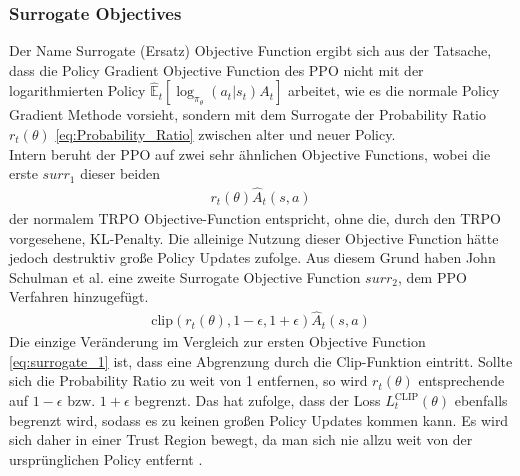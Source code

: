 \subsubsection{Surrogate Objectives} \label{sec:Surrogate_Objectives}
Der Name Surrogate (Ersatz) Objective Function ergibt sich aus der Tatsache, dass die Policy Gradient Objective Function des PPO nicht mit der logarithmierten Policy $\mathbb{\hat{E}}_t[\log_{\pi_{\theta}}(a_t|s_t)A_t]$ arbeitet, wie es die normale Policy Gradient Methode vorsieht, sondern mit dem Surrogate der Probability Ratio $r_{t}(\theta)$ \ref{eq:Probability_Ratio} zwischen alter und neuer Policy.\\
Intern beruht der PPO auf zwei sehr ähnlichen Objective Functions, wobei die erste $surr_1$ dieser beiden
\begin{align}
	\label{eq:surrogate_1}
	r_{t}(\theta) \hat{A}_{t}(s, a)
\end{align}
der normalem TRPO Objective-Function entspricht, ohne die, durch den TRPO vorgesehene, KL-Penalty. \cite[S. 3 f.]{PPO}
Die alleinige Nutzung dieser Objective Function hätte jedoch destruktiv große Policy Updates zufolge. Aus diesem Grund haben John Schulman et al. eine zweite Surrogate Objective Function $surr_2$, dem PPO Verfahren hinzugefügt. 
\begin{align}
	\label{eq:surrogate_2}
	\text{clip}(r_{t}(\theta), 1 - \epsilon, 1 + \epsilon) \hat{A}_{t}(s, a)
\end{align}
Die einzige Veränderung im Vergleich zur ersten Objective Function \ref{eq:surrogate_1} ist, dass eine Abgrenzung durch die Clip-Funktion eintritt. Sollte sich die Probability Ratio zu weit von 1 entfernen, so wird $r_{t}(\theta)$ entsprechende auf $1 - \epsilon \text{ bzw. } 1 + \epsilon$ begrenzt. Das hat zufolge, dass der Loss $L^{\text{CLIP}}_{t}(\theta)$ ebenfalls begrenzt wird, sodass es zu keinen großen Policy Updates kommen kann. Es wird sich daher in einer Trust Region bewegt, da man sich nie allzu weit von der ursprünglichen Policy entfernt \cite{TRPO, PPO}.

